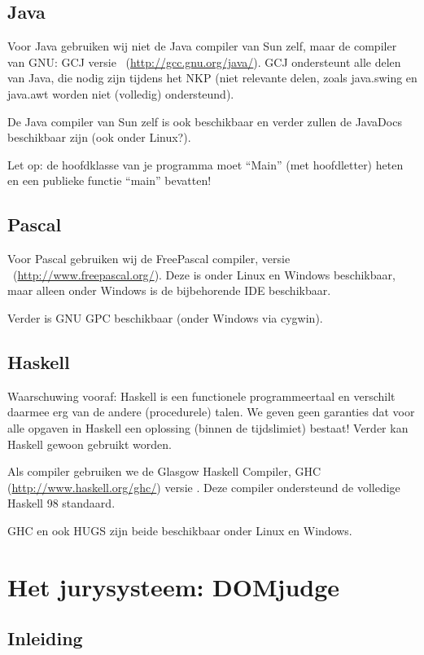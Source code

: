 \documentclass[11pt,titlepage,a4paper]{article}
\newcommand{\DOMjudge}{DOMjudge }
\begin{document}
\subsection{Java}

Voor Java gebruiken wij niet de Java compiler van Sun zelf, maar de
compiler van GNU: GCJ versie \LINUXGCJ\
(\url{http://gcc.gnu.org/java/}). GCJ ondersteunt
alle delen van Java, die nodig zijn tijdens het NKP (niet relevante
delen, zoals java.swing en java.awt worden niet (volledig)
ondersteund).

De Java compiler van Sun zelf is ook beschikbaar en verder zullen de
JavaDocs beschikbaar zijn (ook onder Linux?).

Let op: de hoofdklasse van je programma moet ``Main'' (met
hoofdletter) heten en een publieke functie ``main'' bevatten!

\subsection{Pascal}

Voor Pascal gebruiken wij de FreePascal compiler, versie
\LINUXFPC\ (\url{http://www.freepascal.org/}). Deze is onder
Linux en Windows beschikbaar, maar alleen onder Windows is de
bijbehorende IDE beschikbaar.

Verder is GNU GPC beschikbaar (onder Windows via cygwin).

\subsection{Haskell}

Waarschuwing vooraf: Haskell is een functionele programmeertaal en
verschilt daarmee erg van de andere (procedurele) talen. We geven geen
garanties dat voor alle opgaven in Haskell een oplossing (binnen de
tijdslimiet) bestaat! Verder kan Haskell gewoon gebruikt worden.

Als compiler gebruiken we de Glasgow Haskell Compiler, GHC
(\url{http://www.haskell.org/ghc/}) versie \LINUXGHC. Deze compiler
ondersteund de volledige Haskell 98 standaard.

GHC en ook HUGS zijn beide beschikbaar onder Linux en Windows.


\section{Het jurysysteem: \DOMjudge}

\subsection{Inleiding}
\end{document}
